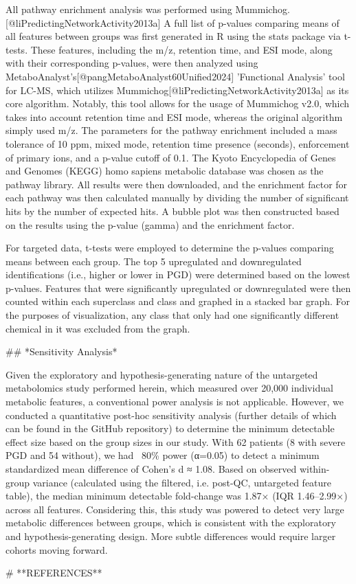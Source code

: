 All pathway enrichment analysis was performed using Mummichog.[@liPredictingNetworkActivity2013a] A full list of p-values comparing means of all features between groups was first generated in R using the stats package via t-tests. These features, including the m/z, retention time, and ESI mode, along with their corresponding p-values, were then analyzed using MetaboAnalyst's[@pangMetaboAnalyst60Unified2024] 'Functional Analysis' tool for LC-MS, which utilizes Mummichog[@liPredictingNetworkActivity2013a] as its core algorithm. Notably, this tool allows for the usage of Mummichog v2.0, which takes into account retention time and ESI mode, whereas the original algorithm simply used m/z. The parameters for the pathway enrichment included a mass tolerance of 10 ppm, mixed mode, retention time presence (seconds), enforcement of primary ions, and a p-value cutoff of 0.1. The Kyoto Encyclopedia of Genes and Genomes (KEGG) homo sapiens metabolic database was chosen as the pathway library. All results were then downloaded, and the enrichment factor for each pathway was then calculated manually by dividing the number of significant hits by the number of expected hits. A bubble plot was then constructed based on the results using the p-value (gamma) and the enrichment factor.

For targeted data, t-tests were employed to determine the p-values comparing means between each group. The top 5 upregulated and downregulated identifications (i.e., higher or lower in PGD) were determined based on the lowest p-values. Features that were significantly upregulated or downregulated were then counted within each superclass and class and graphed in a stacked bar graph. For the purposes of visualization, any class that only had one significantly different chemical in it was excluded from the graph.

## *Sensitivity Analysis*

Given the exploratory and hypothesis-generating nature of the untargeted metabolomics study performed herein, which measured over 20,000 individual metabolic features, a conventional power analysis is not applicable. However, we conducted a quantitative post-hoc sensitivity analysis (further details of which can be found in the GitHub repository) to determine the minimum detectable effect size based on the group sizes in our study. With 62 patients (8 with severe PGD and 54 without), we had ~80\% power (α=0.05) to detect a minimum standardized mean difference of Cohen's d ≈ 1.08. Based on observed within-group variance (calculated using the filtered, i.e. post-QC, untargeted feature table), the median minimum detectable fold-change was 1.87× (IQR 1.46–2.99×) across all features. Considering this, this study was powered to detect very large metabolic differences between groups, which is consistent with the exploratory and hypothesis-generating design. More subtle differences would require larger cohorts moving forward.

\newpage

# **REFERENCES**